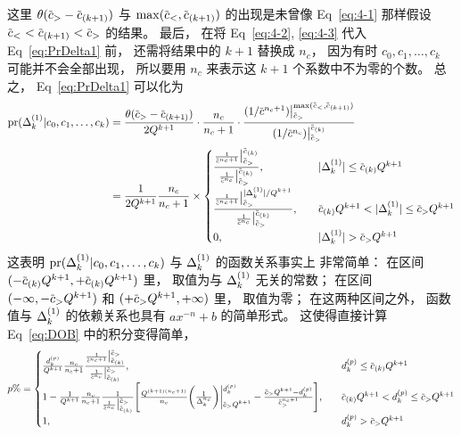 这里 $\theta(\dmscbar_>-\dmscbar_{(k+1)})$ 与
$\max(\dmscbar_<,\dmscbar_{(k+1)})$ 的出现是未曾像 Eq~\eqref{eq:4-1} 那样假设
$\dmscbar_< <\dmscbar_{(k+1)}<\dmscbar_>$ 的结果。
最后，
在将 Eq~\eqref{eq:4-2}, \eqref{eq:4-3} 代入 Eq~\eqref{eq:PrDelta1} 前，
还需将结果中的 $k+1$ 替换成 $n_c$，
因为有时 $c_0,c_1,\ldots,c_k$ 可能并不会全部出现，
所以要用 $n_c$ 来表示这 $k+1$ 个系数中不为零的个数。
总之，
Eq~\eqref{eq:PrDelta1} 可以化为
\begin{equation}
  \label{eq:PrDeltaSetA}
  \begin{aligned}
    \dmspr(\dmsdeltako|\dmsccck) &=
    \frac{\theta(\dmscbar_>-\dmscbar_{(k+1)})}{2Q^{k+1}}\cdot
    \frac{n_c}{n_c+1}\cdot\frac{(1/\dmscbar^{n_c+1})\dmsvat{\dmscbar_>}{
        \max(\dmscbar_<,\dmscbar_{(k+1)})}}{(1/\dmscbar^{n_c})\dmsvat{
        \dmscbar_>}{\dmscbar_{(k)}}} \\
    &= \frac{1}{2Q^{k+1}} \frac{n_c}{n_c+1} \times
    \begin{cases}
      \frac{\frac{1}{\dmscbar^{n_c+1}}
        \dmsvat{\dmscbar_>}{\dmscbar_{(k)}}}{
        \frac{1}{\dmscbar^{n_c}}
        \dmsvat{\dmscbar_>}{\dmscbar_{(k)}}},
      &\quad |\dmsdeltako|\le\dmscbar_{(k)}Q^{k+1} \\
      \frac{\frac{1}{\dmscbar^{n_c+1}}
        \dmsvat{\dmscbar_>}{|\dmsdeltako|/Q^{k+1}}}{
        \frac{1}{\dmscbar^{n_c}}
        \dmsvat{\dmscbar_>}{\dmscbar_{(k)}}},
      &\quad \dmscbar_{(k)}Q^{k+1}<|\dmsdeltako|\le\dmscbar_>Q^{k+1} \\
      0, &\quad |\dmsdeltako|>\dmscbar_>Q^{k+1}
    \end{cases}
  \end{aligned}
\end{equation}
这表明 $\textrm{pr}(\Delta_k^{(1)}|c_0,c_1,\ldots,c_k)$ 与 $\Delta_k^{(1)}$ 的函数关系事实上
非常简单：
在区间 $(-\dmscbar_{(k)}Q^{k+1},+\dmscbar_{(k)}Q^{k+1})$ 里，
取值为与 $\Delta_k^{(1)}$ 无关的常数；
在区间 $(-\infty,-\dmscbar_>Q^{k+1})$ 和 $(+\dmscbar_>Q^{k+1},+\infty)$ 里，
取值为零；
在这两种区间之外，
函数值与 $\Delta_k^{(1)}$ 的依赖关系也具有 $ax^{-n}+b$ 的简单形式。
这使得直接计算 Eq~\eqref{eq:DOB} 中的积分变得简单，
\begin{equation}
  \label{eq:DOBSetA}
  p\%=
  \begin{cases}
    \frac{\dmsdkp}{Q^{k+1}} \frac{n_c}{n_c+1}
    \frac{ \frac{1}{\dmscbar^{n_c+1}}\dmsvat{\dmscbar_{(k)}}{\dmscbar_>}}{
      \frac{1}{\dmscbar^{n_c}}\dmsvat{\dmscbar_{(k)}}{\dmscbar_>}},
    &\quad \dmsdkp\le\dmscbar_{(k)}Q^{k+1} \\
    1 - \frac{1}{Q^{k+1}} \frac{n_c}{n_c+1}
    \frac{1}{\frac{1}{\dmscbar^{n_c}}\dmsvat{\dmscbar_{(k)}}{\dmscbar_>}}
    \Biggl[ \frac{Q^{(k+1)(n_c+1)}}{n_c}\biggl( \frac{1}{\Delta_k^{n_c}}
      \biggr)\dmsvat[\bigg]{\dmscbar_>Q^{k+1}}{\dmsdkp}-
      \frac{\dmscbar_>Q^{k+1}-\dmsdkp}{\dmscbar_>^{n_c+1}}\Biggr],
    &\quad \dmscbar_{(k)}Q^{k+1} < \dmsdkp \le \dmscbar_>Q^{k+1} \\
    1, &\quad \dmsdkp > \dmscbar_>Q^{k+1}
  \end{cases}
\end{equation}
